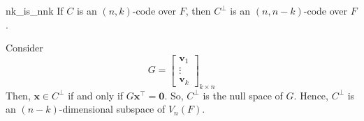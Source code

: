 \begin{Theorem}{}{nk_is_nnk}
    If $ C $ is an $ (n,k) $-code over $ F $, then $ C^{\perp} $ is an
    $ (n,n-k) $-code over $ F $.
\end{Theorem}

\begin{Proof}{}{}
    Consider
    \[ G=\begin{bmatrix}
            \symbf{v}_1 \\
            \vdots      \\
            \symbf{v}_k
        \end{bmatrix}_{k\times n} \]
    Then, $ \symbf{x}\in C^{\perp} $ if and only if $ G \symbf{x}^{\top}=\symbf{0} $. So, $ C^{\perp} $
    is the null space of $ G $. Hence, $ C^{\perp} $ is an
    $ (n-k) $-dimensional subspace of $ V_n(F) $.
\end{Proof}
